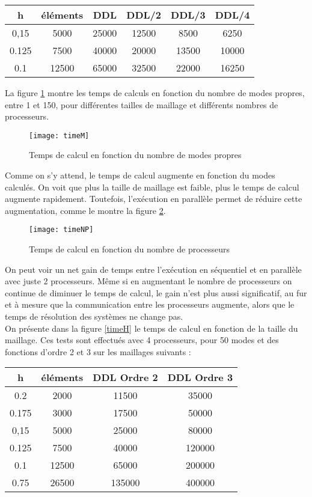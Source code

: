 \begin{center}
\begin{tabular}{c|c|c|c|c|c}
h & éléments & DDL & DDL/2 & DDL/3 & DDL/4\\ \hline
0,15 & 5000 & 25000 & 12500 & 8500 & 6250\\ \hline
0.125 & 7500 & 40000 & 20000 & 13500 & 10000\\ \hline
0.1 & 12500 & 65000 & 32500 & 22000 & 16250
\end{tabular}
\end{center}

La figure \ref{timeM} montre les temps de calculs en fonction du nombre de modes propres, entre 1 et 150, pour différentes tailles de maillage et différents nombres de processeurs.\\

\begin{figure}[H]
\centering
\texttt{[image: timeM]}
\caption{Temps de calcul en fonction du nombre de modes propres}
\label{timeM}
\end{figure}
Comme on s'y attend, le temps de calcul augmente en fonction du modes calculés. On voit que plus la taille de maillage est faible, plus le temps de calcul augmente rapidement. Toutefois, l'exécution en parallèle permet de réduire cette augmentation, comme le montre la figure \ref{timeNP}.
\begin{figure}[H]
\centering
\texttt{[image: timeNP]}
\caption{Temps de calcul en fonction du nombre de processeurs}
\label{timeNP}
\end{figure}
On peut voir un net gain de temps entre l'exécution en séquentiel et en parallèle avec juste 2 processeurs. Même si en augmentant le nombre de processeurs on continue de diminuer le temps de calcul, le gain n'est plus aussi significatif, au fur et à mesure que la communication entre les processeurs augmente, alors que le temps de résolution des systèmes ne change pas.\\

On présente dans la figure \ref{timeH} le temps de calcul en fonction de la taille du maillage. Ces tests sont effectués avec 4 processeurs, pour 50 modes et des fonctions d'ordre 2 et 3 sur les maillages suivants :
\begin{center}
\begin{tabular}{c|c|c|c}
h & éléments & DDL Ordre 2 & DDL  Ordre 3\\ \hline
0.2 & 2000 & 11500 & 35000 \\ \hline
0.175 & 3000 & 17500 & 50000 \\ \hline
0,15 & 5000 & 25000 & 80000 \\ \hline
0.125 & 7500 & 40000 & 120000 \\ \hline
0.1 & 12500 & 65000 & 200000 \\ \hline
0.75 & 26500 & 135000 & 400000
\end{tabular}
\end{center}

